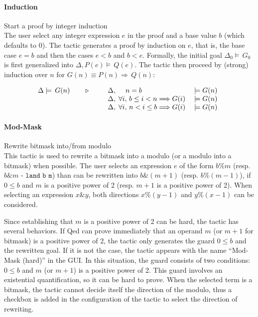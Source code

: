 \paragraph{Induction} Start a proof by integer induction \\
The user select any integer expression $e$ in the proof and a base value $b$ (which defaults to
0). The tactic generates a proof by induction on $e$, that is, the base case
$e = b$ and then the cases $e < b$ and $b < e$. Formally, the initial goal
$\Delta_0\models\,G_0$ is first generalized into $\Delta,P(e)\models\,Q(e)$. The tactic
then proceed by (strong) induction over $n$ for
$G(n) \equiv P(n)\Longrightarrow\,Q(n)$:

\[\TACTIC{\Delta\models\,G(n)}{%
\begin{array}[t]{lll}
\Delta,\; \quad n = b & \models G(n) \\
\Delta,\; \forall i,\, b \leq i < n \Longrightarrow G(i) \; & \models G(n) \\
\Delta,\; \forall i,\, n < i \leq b \Longrightarrow G(i) \; & \models G(n)
\end{array}} \]

\paragraph{Mod-Mask} Rewrite bitmask into/from modulo \\
This tactic is used to rewrite a bitmask into a modulo (or a modulo into a
bitmask) when possible. The user selects an expression $e$ of the form
$b \% m$ (resp. $b \& m$ - $\texttt{land b m}$) than can be rewritten into
$b \& (m+1)$ (resp. $b \% (m - 1)$), if $0 \leq b$ and $m$ is a positive power
of 2 (resp. $m + 1$ is a positive power of 2). When selecting an expression
$x \& y$, both directions $x \% (y - 1)$ and $y \% (x - 1)$ can be considered.

Since establishing that $m$ is a positive power of 2 can be hard, the tactic has
several behaviors. If \textsf{Qed} can prove immediately that an operand $m$ (or
$m+1$ for bitmask) is a positive power of 2, the tactic only generates the guard
$0 \leq b$ and the rewritten goal. If it is not the case, the tactic appears
with the name ``Mod-Mask (hard)'' in the GUI. In this situation, the guard
consists of two conditions: $0 \leq b$ and $m$ (or $m+1$) is a positive power of
2. This guard involves an existential quantification, so it can be hard to
prove. When the selected term is a bitmask, the tactic cannot decide itself the
direction of the modulo, thus a checkbox is added in the configuration of the
tactic to select the direction of rewriting.

